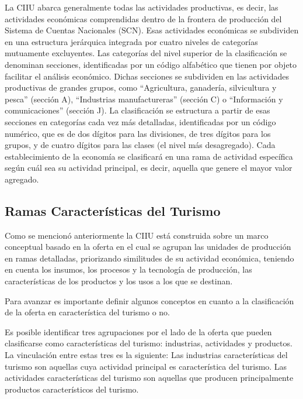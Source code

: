 \documentclass[
  openany]{book}
\begin{document}
La CIIU abarca generalmente todas las actividades productivas, es decir, las actividades económicas comprendidas dentro de la frontera de producción del Sistema de Cuentas Nacionales (SCN). Esas actividades económicas se subdividen en una estructura jerárquica integrada por cuatro niveles de categorías mutuamente excluyentes. Las categorías del nivel superior de la clasificación se denominan secciones, identificadas por un código alfabético que tienen por objeto facilitar el análisis económico. Dichas secciones se subdividen en las actividades productivas de grandes grupos, como ``Agricultura, ganadería, silvicultura y pesca'' (sección A), ``Industrias manufactureras'' (sección C) o ``Información y comunicaciones'' (sección J). La clasificación se estructura a partir de esas secciones en categorías cada vez más detalladas, identificadas por un código numérico, que es de dos dígitos para las divisiones, de tres dígitos para los grupos, y de cuatro dígitos para las clases (el nivel más desagregado). Cada establecimiento de la economía se clasificará en una rama de actividad específica según cuál sea su actividad principal, es decir, aquella que genere el mayor valor agregado.

\hypertarget{ramas-caracteristicas}{%
\subsection{Ramas Características del Turismo}\label{ramas-caracteristicas}}

Como se mencionó anteriormente la CIIU está construida sobre un marco conceptual basado en la oferta en el cual se agrupan las unidades de producción en ramas detalladas, priorizando similitudes de su actividad económica, teniendo en cuenta los insumos, los procesos y la tecnología de producción, las características de los productos y los usos a los que se destinan.

Para avanzar es importante definir algunos conceptos en cuanto a la clasificación de la oferta en característica del turismo o no.

Es posible identificar tres agrupaciones por el lado de la oferta que pueden clasificarse como características del turismo: industrias, actividades y productos. La vinculación entre estas tres es la siguiente: Las industrias características del turismo son aquellas cuya actividad principal es característica del turismo. Las actividades características del turismo son aquellas que producen principalmente productos característicos del turismo.
\end{document}
